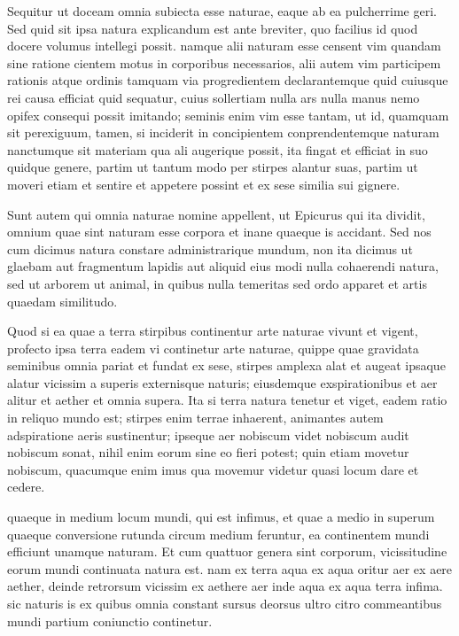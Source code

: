  Sequitur ut doceam omnia subiecta esse naturae, eaque ab ea pulcherrime geri. Sed quid sit ipsa natura explicandum est ante breviter, quo facilius id quod docere volumus intellegi possit. namque alii naturam esse censent vim quandam sine ratione cientem motus in corporibus necessarios, alii autem vim participem rationis atque ordinis tamquam via progredientem declarantemque quid cuiusque rei causa efficiat quid sequatur, cuius sollertiam nulla ars nulla manus nemo opifex consequi possit imitando; seminis enim vim esse tantam, ut id, quamquam sit perexiguum, tamen, si inciderit in concipientem conprendentemque naturam nanctumque sit materiam qua ali augerique possit, ita fingat et efficiat in suo quidque genere, partim ut tantum modo per stirpes alantur suas, partim ut moveri etiam et sentire et appetere possint et ex sese similia sui gignere.

 Sunt autem qui omnia naturae nomine appellent, ut Epicurus qui ita dividit, omnium quae sint naturam esse corpora et inane quaeque is accidant. Sed nos cum dicimus natura constare administrarique mundum, non ita dicimus ut glaebam aut fragmentum lapidis aut aliquid eius modi nulla cohaerendi natura, sed ut arborem ut animal, in quibus nulla temeritas sed ordo apparet et artis quaedam similitudo.

 Quod si ea quae a terra stirpibus continentur arte naturae vivunt et vigent, profecto ipsa terra eadem vi continetur arte naturae, quippe quae gravidata seminibus omnia pariat et fundat ex sese, stirpes amplexa alat et augeat ipsaque alatur vicissim a superis externisque naturis; eiusdemque exspirationibus et aer alitur et aether et omnia supera. Ita si terra natura tenetur et viget, eadem ratio in reliquo mundo est; stirpes enim terrae inhaerent, animantes autem adspiratione aeris sustinentur; ipseque aer nobiscum videt nobiscum audit nobiscum sonat, nihil enim eorum sine eo fieri potest; quin etiam movetur nobiscum, quacumque enim imus qua movemur videtur quasi locum dare et cedere.

 quaeque in medium locum mundi, qui est infimus, et quae a medio in superum quaeque conversione rutunda circum medium feruntur, ea continentem mundi efficiunt unamque naturam. Et cum quattuor genera sint corporum, vicissitudine eorum mundi continuata natura est. nam ex terra aqua ex aqua oritur aer ex aere aether, deinde retrorsum vicissim ex aethere aer inde aqua ex aqua terra infima. sic naturis is ex quibus omnia constant sursus deorsus ultro citro commeantibus mundi partium coniunctio continetur.

